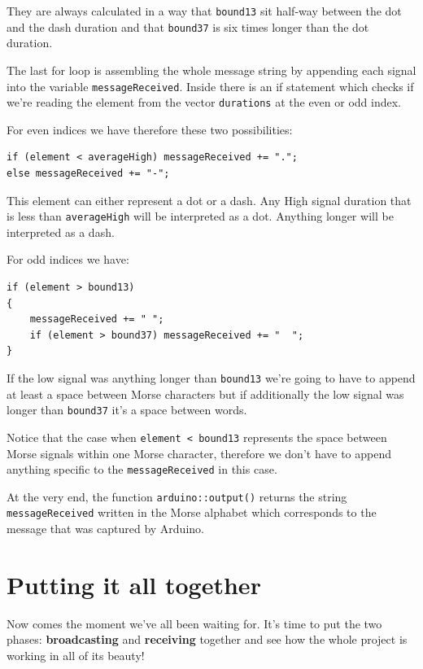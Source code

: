 \documentclass[10pt]{report}
\begin{document}
They are always calculated in a way that \texttt{bound13} sit half-way between the dot and the dash duration and that \texttt{bound37} is six times longer than the dot duration.

The last for loop is assembling the whole message string by appending each signal into the variable \texttt{messageReceived}. Inside there is an if statement which checks if we're reading the element from the vector \texttt{durations} at the even or odd index.

For even indices we have therefore these two possibilities:

\begin{lstlisting}
if (element < averageHigh) messageReceived += ".";
else messageReceived += "-";
\end{lstlisting}

This element can either represent a dot or a dash. Any High signal duration that is less than \texttt{averageHigh} will be interpreted as a dot. Anything longer will be interpreted as a dash.

\newpage

For odd indices we have:

\begin{lstlisting}
if (element > bound13)
{
	messageReceived += " ";
	if (element > bound37) messageReceived += "  ";
}
\end{lstlisting}

If the low signal was anything longer than \texttt{bound13} we're going to have to append at least a space between Morse characters but if additionally the low signal was longer than \texttt{bound37} it's a space between words.

Notice that the case when \texttt{element < bound13} represents the space between Morse signals within one Morse character, therefore we don't have to append anything specific to the \texttt{messageReceived} in this case.

At the very end, the function \texttt{arduino::output()} returns the string \texttt{messageReceived} written in the Morse alphabet which corresponds to the message that was captured by Arduino.

\chapter{Putting it all together}

Now comes the moment we've all been waiting for. It's time to put the two phases: \textbf{broadcasting} and \textbf{receiving} together and see how the whole project is working in all of its beauty!
\end{document}
